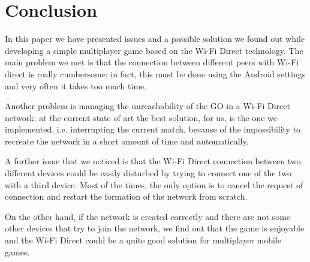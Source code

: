 \section{Conclusion}
In this paper we have presented issues and a possible solution we
found out while developing a simple multiplayer game based on the Wi-Fi Direct
technology. The main problem we met is that the connection between
different peers with Wi-Fi direct is really cumbersome: in fact, this must be
done using the Android settings and very often it takes too much time.

Another problem is managing the unreachability of the GO in a Wi-Fi Direct
network: at the current state of art the best solution, for us, is the one we
implemented, i.e. interrupting the current match, because of the
impossibility to recreate the network in a short amount of time and
automatically.

A further issue that we noticed is that the Wi-Fi Direct connection
between two different devices could be easily disturbed by trying to connect
one of the two with a third device. Most of the times, the only option is to
cancel the request of connection and restart the formation of the network from
scratch.

On the other hand, if the network is created correctly and there are not 
some other devices that try to join the network, we find out that the game 
is enjoyable and the Wi-Fi Direct could be a quite good solution for 
multiplayer mobile games.
